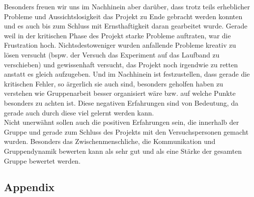 \documentclass{Bericht}
\begin{document}
Besonders freuen wir uns im Nachhinein aber darüber, dass trotz teils erheblicher Probleme und Aussichtslosigkeit das Projekt zu Ende gebracht werden konnten und es auch bis zum Schluss mit Ernsthaftigkeit daran gearbeitet wurde. Gerade weil in der kritischen Phase des Projekt starke Probleme auftraten, war die Frustration hoch. Nichtsdestoweniger wurden anfallende Probleme kreativ zu lösen versucht (bspw. der Versuch das Experiment auf das Laufband zu verschieben) und gewissenhaft versucht, das Projekt noch irgendwie zu retten anstatt es gleich aufzugeben. Und im Nachhinein ist festzustellen, dass gerade die kritischen Fehler, so ärgerlich sie auch sind, besonders geholfen haben zu verstehen wie Gruppenarbeit besser organisiert wäre bzw. auf welche Punkte besonders zu achten ist. Diese negativen Erfahrungen sind von Bedeutung, da gerade auch durch diese viel gelernt werden kann.\\
Nicht unerwähnt sollen auch die positiven Erfahrungen sein, die innerhalb der Gruppe und gerade zum Schluss des Projekts mit den Versuchspersonen gemacht wurden. Besonders das Zwischenmenschliche, die Kommunikation und Gruppendynamik bewerten kann als sehr gut und als eine Stärke der gesamten Gruppe bewertet werden.

	


\newpage



\begin{appendix}
\section{Appendix} %

%
	\printbibliography
	\end{appendix}
\vfill %
\end{document}
